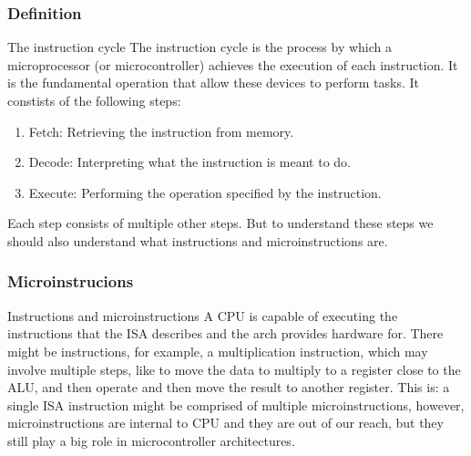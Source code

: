 \documentclass[aspectratio=169]{beamer}
\begin{document}
\subsubsection{Definition}
\begin{frame}{The instruction cycle}
  The instruction cycle is the process by which a microprocessor (or microcontroller) achieves the execution of each instruction. It is the fundamental operation that allow these devices to perform tasks. It constists of the following steps:
  \begin{enumerate}
        \item <2-> Fetch: Retrieving the instruction from memory.
        \item <3-> Decode: Interpreting what the instruction is meant to do.
        \item <4-> Execute: Performing the operation specified by the instruction.
  \end{enumerate}
  Each step consists of multiple other steps. But to understand these steps we should also understand what instructions and microinstructions are.
\end{frame}

\subsubsection{Microinstrucions}
\begin{frame}{Instructions and microinstructions}
  A CPU is capable of executing the instructions that the ISA describes and the \textmu arch provides hardware for. 
  There might be instructions, for example, a multiplication instruction, which may involve multiple steps, like to move the data to multiply to a register close to the ALU, and then operate and then move the result to another register. This is: a single ISA instruction might be comprised of multiple microinstructions, however, microinstructions are internal to CPU and they are out of our reach, but they still play a big role in microcontroller architectures.
\end{frame}
\end{document}
